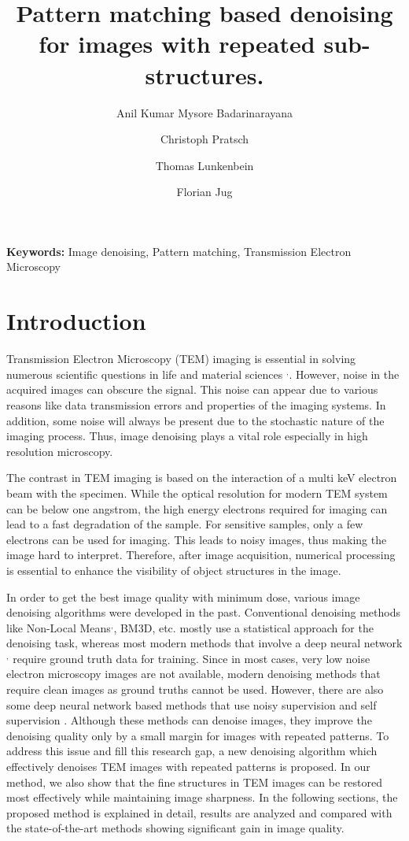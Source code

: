 \documentclass[fleqn,10pt]{wlscirep}
\title{Pattern matching based denoising for images with repeated sub-structures.}
\author[1,*]{Anil Kumar Mysore Badarinarayana}
\author[1]{Christoph Pratsch}
\author[2]{Thomas Lunkenbein}
\author[3]{Florian Jug}
\affil[1]{Hemholtz-Zentrum Berlin, X-ray microscopy, Berlin, 12489, Germany}
\affil[2]{Fritz Haber Institute, Department of Inorganic Chemistry, Berlin, 14195, Germany}
\affil[3]{Fondazione Human Technopole, Computational Biology, Milan, 20157, Italy}
\affil[*]{anil.mysore\_badarinarayana@helmholtz-berlin.de}
\begin{document}
	
	\maketitle
	
	\noindent
	\textbf{Keywords:} Image denoising, Pattern matching, Transmission Electron Microscopy
	
	\section*{Introduction}
	
	Transmission Electron Microscopy (TEM) imaging is essential in solving numerous scientific questions in life and material sciences \cite{CURRY200691}$^{,}$\cite{WANG2008395}. However, noise in the acquired images can obscure the signal. This noise can appear due to various reasons like data transmission errors and properties of the imaging systems. In addition, some noise will always be present due to the stochastic nature of the imaging process. Thus, image denoising plays a vital role especially in high resolution microscopy.
	
	The contrast in TEM imaging is based on the interaction of a multi keV electron beam with the specimen. While the optical resolution for modern TEM system can be below one angstrom,  the high energy electrons required for imaging can lead to a fast degradation of the sample. For sensitive samples, only a few electrons can be used for imaging. This leads to noisy images, thus making the image hard to interpret. Therefore, after image acquisition, numerical processing is essential to enhance the visibility of object structures in the image.
	
	In order to get the best image quality with minimum dose, various image denoising algorithms were developed in the past. Conventional denoising methods like Non-Local Means\cite{bcm_nlm}$^{,}$, BM3D\cite{DBLP:journals/tip/BM3D}, etc. mostly use a statistical approach for the denoising task, whereas most modern methods that involve a deep neural network\cite{zhang2018ffdnet}$^{,}$ \cite{zhang2017beyond} require ground truth data for training. Since in most cases, very low noise electron microscopy images are not available, modern denoising methods that require clean images as ground truths cannot be used. However, there are also some deep neural network based methods that use noisy supervision\cite{DBLP:journals/corr/abs-1803-04189} and self supervision\cite{krull2019noise2void} . Although these methods can denoise images, they improve the denoising quality only by a small margin for images with repeated patterns. To address this issue and fill this research gap, a new denoising algorithm which effectively denoises TEM images with repeated patterns is proposed. In  our method, we also show that the fine structures in TEM images can be restored most effectively while maintaining image sharpness. In the following sections, the proposed method is explained in detail, results are analyzed and compared with the state-of-the-art methods showing significant gain in image quality. 
	
\end{document}
